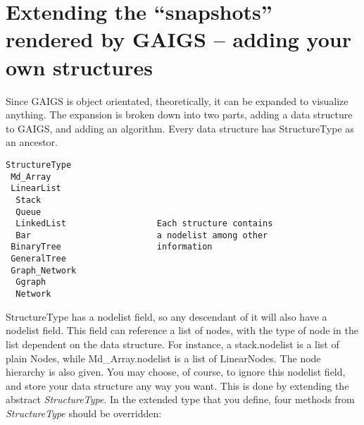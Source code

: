 \documentclass[12pt]{article}
\begin{document}
\newpage
\section{Extending the ``snapshots'' rendered by GAIGS -- adding your own structures}

Since GAIGS is object orientated, theoretically, it can be expanded to
visualize anything.  The expansion is broken down into two parts,
adding a data structure to GAIGS, and adding an algorithm.  Every data
structure has StructureType as an ancestor.  

\small
\begin{verbatim}
StructureType 
 Md_Array     
 LinearList   
  Stack       
  Queue       
  LinkedList                  Each structure contains
  Bar                         a nodelist among other
 BinaryTree                   information
 GeneralTree        
 Graph_Network     
  Ggraph           
  Network          
\end{verbatim}
\normalsize

StructureType has a
nodelist field, so any descendant of it will also have a nodelist
field.  This field can reference a list of nodes, with the type of
node in the list dependent on the data structure.  
For instance, a
stack.nodelist is a list of plain Nodes, while Md\_Array.nodelist is a
list of LinearNodes.  
The node hierarchy is also given.  You may
choose, of course, to ignore this nodelist field, and store your data
structure any way you want.  This is done by extending the abstract
\textit{StructureType}.  In the extended type that you define, four
methods from \textit{StructureType} should be overridden:
\end{document}
